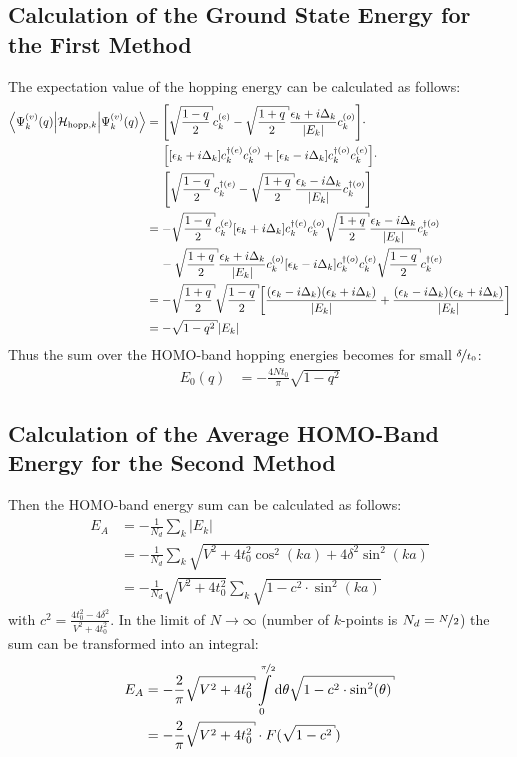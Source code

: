 \subsection*{Calculation of the Ground State Energy for the First Method}
The expectation value of the hopping energy can be calculated as follows:
\begin{align}
\left\langle\Psi_k^{(v)}(q)\Big|\mathcal{H}_{\text{hopp},k}\Big|\Psi_k^{(v)}(q)\right\rangle &= \left[\sqrt{\frac{1-q}{2}}c_k^{(e)}- \sqrt{\frac{1+q}{2}}\frac{\epsilon_k + i \Delta_k}{|E_k|}c_{k}^{(o)}\right]\cdot\nonumber\\
&\hspace*{0.5cm}\left[
\left[\epsilon_k + i\Delta_k\right]c_{k}^{\dagger(e)}c_{k}^{(o)} + \left[\epsilon_k-i\Delta_k \right]	c_{k}^{\dagger(o)}c_{k}^{(e)}
\right]\cdot\nonumber\\
&\hspace*{0.5cm}\left[\sqrt{\frac{1-q}{2}}c_k^{\dagger(e)}- \sqrt{\frac{1+q}{2}}\frac{\epsilon_k - i \Delta_k}{|E_k|}c_{k}^{\dagger(o)}\right]\\
&=-\sqrt{\frac{1-q}{2}}c_k^{(e)}\left[\epsilon_k+i\Delta_k \right]	c_{k}^{\dagger(e)}c_{k}^{(o)}\sqrt{\frac{1+q}{2}}\frac{\epsilon_k - i \Delta_k}{|E_k|}c_{k}^{\dagger(o)}\nonumber\\
&\hspace*{0.4cm}-\sqrt{\frac{1+q}{2}}\frac{\epsilon_k + i \Delta_k}{|E_k|}c_{k}^{(o)}\left[\epsilon_k - i\Delta_k\right]c_{k}^{\dagger(o)}c_{k}^{(e)}\sqrt{\frac{1-q}{2}}c_k^{\dagger(e)}\\
&=-\sqrt{\frac{1+q}{2}}\sqrt{\frac{1-q}{2}}\left[\frac{(\epsilon_k-i\Delta_k)(\epsilon_k+i\Delta_k)}{|E_k|}+\frac{(\epsilon_k-i\Delta_k)(\epsilon_k+i\Delta_k)}{|E_k|}\right]\\
&= -\sqrt{1-q^2} |E_k|
\end{align}
Thus the sum over the HOMO-band hopping energies becomes for small $\nicefrac{\delta}{t_0}$:
\begin{align}
E_0(q) &= -\frac{4Nt_0}{\pi} \sqrt{1-q^2}
\end{align}
\subsection*{Calculation of the Average HOMO-Band Energy for the Second Method}
Then the HOMO-band energy sum can be calculated as follows:
\begin{align}
E_A &= -\frac{1}{N_d}\sum_k |E_k|\\
&= -\frac{1}{N_d}\sum_k \sqrt{V^2 + 4t_0^2\cos^2(ka) + 4 \delta^2\sin^2(ka)}\\
&= -\frac{1}{N_d}\sqrt{V^2 + 4t_0^2}\sum_k \sqrt{1 - c^2 \cdot \sin^2(ka)}
\end{align} 
with $c^2 = \frac{4t_0^2-4\delta^2}{V^2+4t_0^2}$. In the limit of $N \to \infty$ (number of $k$-points is $N_d = \nicefrac{N}{2}$) the sum can be transformed into an integral:
\begin{align}
E_A &= -\frac{2}{\pi} \sqrt{V^2+4t_0^2} \int\limits_{0}^{\nicefrac{\pi}{2}} \text{d}\theta \sqrt{1 - c^2 \cdot \sin^2(\theta)}\\
&= -\frac{2}{\pi} \sqrt{V^2+4t_0^2} \cdot F(\sqrt{1-c^2}) 
\end{align}

